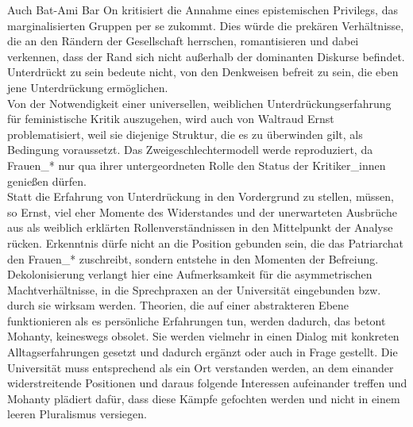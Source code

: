 Auch Bat-Ami Bar On kritisiert die Annahme eines epistemischen Privilegs, das
marginalisierten Gruppen per se zukommt. Dies würde die prekären Verhältnisse,
die an den Rändern der Gesellschaft herrschen, romantisieren und dabei
verkennen, dass der Rand sich nicht außerhalb der dominanten Diskurse befindet.
Unterdrückt zu sein bedeute nicht, von den Denkweisen befreit zu sein, die eben
jene Unterdrückung ermöglichen.\footnotemark {}\\

Von der Notwendigkeit einer universellen, weiblichen Unterdrückungserfahrung
für feministische Kritik auszugehen, wird auch von Waltraud Ernst
problematisiert, weil sie diejenige Struktur, die es zu überwinden gilt, als
Bedingung voraussetzt. Das Zweigeschlechtermodell werde reproduziert, da
Frauen\_* nur qua ihrer untergeordneten Rolle den Status der Kritiker\_innen
genießen dürfen. \\
Statt die Erfahrung von Unterdrückung in den Vordergrund zu
stellen, müssen, so Ernst, viel eher Momente des Widerstandes und der
unerwarteten Ausbrüche aus als weiblich erklärten Rollenverständnissen in den
Mittelpunkt der Analyse rücken. Erkenntnis dürfe nicht an die Position gebunden
sein, die das Patriarchat den Frauen\_* zuschreibt, sondern entstehe in den
Momenten der Befreiung.\footnotemark {}\\

\noindent Dekolonisierung verlangt hier eine
Aufmerksamkeit für die asymmetrischen Machtverhältnisse, in die Sprechpraxen
an der Universität eingebunden bzw. durch sie wirksam werden. Theorien, die auf
einer abstrakteren Ebene funktionieren als es persönliche Erfahrungen tun,
werden dadurch, das betont Mohanty, keineswegs obsolet. Sie werden vielmehr in
einen Dialog mit konkreten Alltagserfahrungen gesetzt und dadurch ergänzt oder
auch in Frage gestellt.\footnotemark {} Die Universität muss entsprechend als ein Ort verstanden
werden, an dem einander widerstreitende Positionen und daraus folgende
Interessen aufeinander treffen und Mohanty plädiert dafür, dass diese Kämpfe
gefochten werden und nicht in einem leeren Pluralismus versiegen.\\

